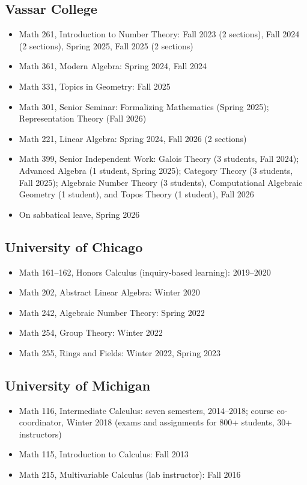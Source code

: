 \documentclass[11pt,letterpaper]{article}
\begin{document}
\subsection{Vassar College}
\begin{itemize}
    \item Math 261, Introduction to Number Theory: Fall 2023 (2 sections), Fall 2024 (2 sections), Spring 2025, Fall 2025 (2 sections)
    \item Math 361, Modern Algebra: Spring 2024, Fall 2024
    \item Math 331, Topics in Geometry: Fall 2025
    \item Math 301, Senior Seminar: Formalizing Mathematics (Spring 2025); Representation Theory (Fall 2026)
    \item Math 221, Linear Algebra: Spring 2024, Fall 2026 (2 sections)
    \item Math 399, Senior Independent Work: Galois Theory (3 students, Fall 2024); Advanced Algebra (1 student, Spring 2025); Category Theory (3 students, Fall 2025); Algebraic Number Theory (3 students), Computational Algebraic Geometry (1 student), and Topos Theory (1 student), Fall 2026
    \item On sabbatical leave, Spring 2026
\end{itemize}
\subsection{University of Chicago}
\begin{itemize}
    \item Math 161--162, Honors Calculus (inquiry-based learning): 2019--2020
    \item Math 202, Abstract Linear Algebra: Winter 2020
    \item Math 242, Algebraic Number Theory: Spring 2022
    \item Math 254, Group Theory: Winter 2022
    \item Math 255, Rings and Fields: Winter 2022, Spring 2023
\end{itemize}
\subsection{University of Michigan}
\begin{itemize}
    \item Math 116, Intermediate Calculus: seven semesters, 2014--2018; course co-coordinator, Winter 2018 (exams and assignments for 800+ students, 30+ instructors)
    \item Math 115, Introduction to Calculus: Fall 2013
    \item Math 215, Multivariable Calculus (lab instructor): Fall 2016
\end{itemize}
\end{document}
